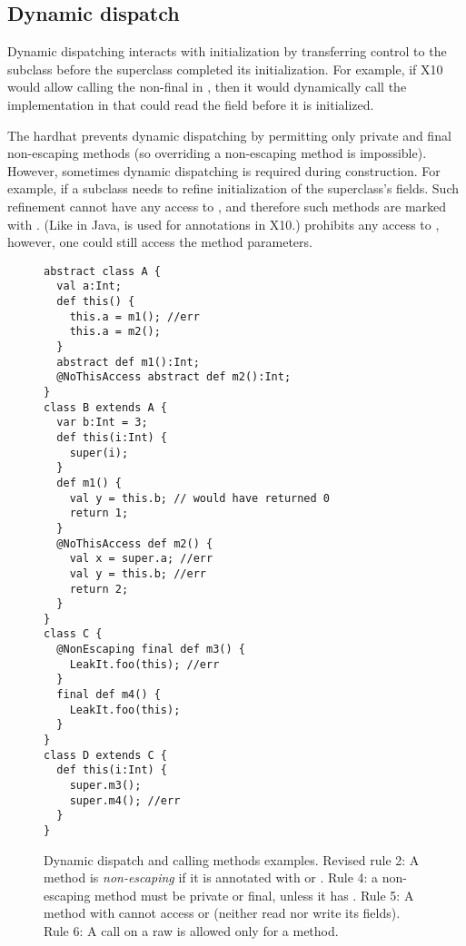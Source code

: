\subsection{Dynamic dispatch}
Dynamic dispatching interacts with initialization by transferring control to the subclass
    before the superclass completed its initialization.
For example, if X10 would allow calling the non-final  in ,
    then it would dynamically call the implementation in  that could read the field 
    before it is initialized.

The hardhat prevents dynamic dispatching by permitting only private and final non-escaping methods
    (so overriding a non-escaping method is impossible).
However, sometimes dynamic dispatching is required during construction.
For example, if a subclass needs to refine initialization
    of the superclass's fields.
Such refinement cannot have any access to \this, and therefore
    such methods are marked with .
(Like in Java,  is used for annotations in X10.)
 prohibits any access to \this,
    however, one could still access the method parameters.



\begin{figure}
\begin{lstlisting}
abstract class A {
  val a:Int;
  def this() {
    this.a = m1(); //err
    this.a = m2();
  }
  abstract def m1():Int;
  @NoThisAccess abstract def m2():Int;
}
class B extends A {
  var b:Int = 3;
  def this(i:Int) {
    super(i);
  }
  def m1() {
    val y = this.b; // would have returned 0
    return 1;
  }
  @NoThisAccess def m2() {
    val x = super.a; //err
    val y = this.b; //err
    return 2;
  }
}
class C {
  @NonEscaping final def m3() {
    LeakIt.foo(this); //err
  }
  final def m4() {
    LeakIt.foo(this);
  }
}
class D extends C {
  def this(i:Int) {
    super.m3();
    super.m4(); //err
  }
}
\end{lstlisting}
\caption{Dynamic dispatch and calling  methods examples.
    Revised rule 2: A method is \emph{non-escaping} if
        it is annotated with  or .
    Rule 4: a non-escaping method must be private or final, unless it has .
    Rule 5: A method with  cannot access \this or  (neither read nor write its fields).
    Rule 6: A call on a raw  is allowed only for a  method.
    }
\label{Figure:Dynamic-dispatch}
\end{figure}

